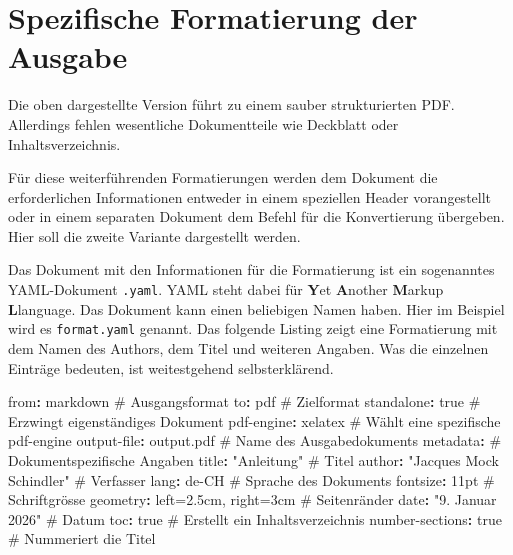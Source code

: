 \documentclass[
  nswissgerman,
  a4paper,
  DIV=11,
  numbers=noendperiod,
  ngerman]{scrreprt}
\newenvironment{Shaded}{\begin{snugshade}}{\end{snugshade}}
\newcommand{\AttributeTok}[1]{\textcolor[rgb]{0.40,0.45,0.13}{#1}}
\newcommand{\CharTok}[1]{\textcolor[rgb]{0.13,0.47,0.30}{#1}}
\newcommand{\CommentTok}[1]{\textcolor[rgb]{0.37,0.37,0.37}{#1}}
\newcommand{\FunctionTok}[1]{\textcolor[rgb]{0.28,0.35,0.67}{#1}}
\newcommand{\KeywordTok}[1]{\textcolor[rgb]{0.00,0.23,0.31}{\textbf{#1}}}
\newcommand{\StringTok}[1]{\textcolor[rgb]{0.13,0.47,0.30}{#1}}
\begin{document}
\section{Spezifische Formatierung der
Ausgabe}\label{spezifische-formatierung-der-ausgabe}

Die oben dargestellte Version führt zu einem sauber strukturierten PDF.
Allerdings fehlen wesentliche Dokumentteile wie Deckblatt oder
Inhaltsverzeichnis.

Für diese weiterführenden Formatierungen werden dem Dokument die
erforderlichen Informationen entweder in einem speziellen Header
vorangestellt oder in einem separaten Dokument dem Befehl für die
Konvertierung übergeben. Hier soll die zweite Variante dargestellt
werden.

Das Dokument mit den Informationen für die Formatierung ist ein
sogenanntes YAML-Dokument \texttt{.yaml}. YAML steht dabei für
\textbf{Y}et \textbf{A}nother \textbf{M}arkup \textbf{L}language. Das
Dokument kann einen beliebigen Namen haben. Hier im Beispiel wird es
\texttt{format.yaml} genannt. Das folgende Listing zeigt eine
Formatierung mit dem Namen des Authors, dem Titel und weiteren Angaben.
Was die einzelnen Einträge bedeuten, ist weitestgehend selbsterklärend.

\begin{Shaded}
\begin{Highlighting}[numbers=left,,]
\FunctionTok{from}\KeywordTok{:}\AttributeTok{ markdown}\CommentTok{                     \# Ausgangsformat }
\FunctionTok{to}\KeywordTok{:}\AttributeTok{ pdf}\CommentTok{                            \# Zielformat}
\FunctionTok{standalone}\KeywordTok{:}\AttributeTok{ }\CharTok{true}\CommentTok{                   \# Erzwingt eigenständiges Dokument}
\FunctionTok{pdf{-}engine}\KeywordTok{:}\AttributeTok{ xelatex}\CommentTok{                \# Wählt eine spezifische pdf{-}engine}
\FunctionTok{output{-}file}\KeywordTok{:}\AttributeTok{ output.pdf}\CommentTok{            \# Name des Ausgabedokuments}
\FunctionTok{metadata}\KeywordTok{:}\CommentTok{                          \# Dokumentspezifische Angaben}
\AttributeTok{  }\FunctionTok{title}\KeywordTok{:}\AttributeTok{ }\StringTok{"Anleitung"}\CommentTok{               \# Titel}
\AttributeTok{  }\FunctionTok{author}\KeywordTok{:}\AttributeTok{ }\StringTok{"Jacques Mock Schindler"}\CommentTok{ \# Verfasser}
\AttributeTok{  }\FunctionTok{lang}\KeywordTok{:}\AttributeTok{ de{-}CH}\CommentTok{                      \# Sprache des Dokuments}
\AttributeTok{  }\FunctionTok{fontsize}\KeywordTok{:}\AttributeTok{ 11pt}\CommentTok{                   \# Schriftgrösse}
\AttributeTok{  }\FunctionTok{geometry}\KeywordTok{:}\AttributeTok{ left=2.5cm, right=3cm}\CommentTok{  \# Seitenränder}
\AttributeTok{  }\FunctionTok{date}\KeywordTok{:}\AttributeTok{ }\StringTok{"9. Januar 2026"}\CommentTok{           \# Datum}
\AttributeTok{  }\FunctionTok{toc}\KeywordTok{:}\AttributeTok{ }\CharTok{true}\CommentTok{                        \# Erstellt ein Inhaltsverzeichnis}
\AttributeTok{  }\FunctionTok{number{-}sections}\KeywordTok{:}\AttributeTok{ }\CharTok{true}\CommentTok{            \# Nummeriert die Titel}
\end{Highlighting}
\end{Shaded}
\end{document}
